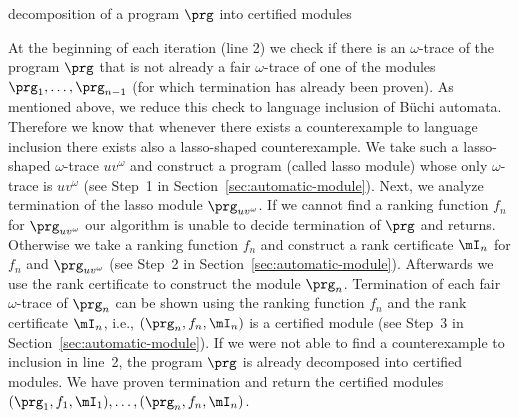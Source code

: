 \begin{algorithm}
\caption{decomposition of a program $\prg$ into certified modules }
\label{algo:decomp}
\end{algorithm}


At the beginning of each iteration (line 2) we check if there is an $\omega$-trace of the program $\prg$ that is not already a fair $\omega$-trace of one of the modules $\prg_1,\dots,\prg_{n-1}$ (for which termination has already been proven). As mentioned above, we reduce this check to language inclusion of Büchi automata. Therefore we know that whenever there exists a counterexample to language inclusion there exists also a lasso-shaped counterexample. We take such a lasso-shaped $\omega$-trace $uv^\omega$ and construct a program (called lasso module) whose only $\omega$-trace is $uv^\omega$ (see Step~1 in Section~\ref{sec:automatic-module}). Next, we analyze termination of the lasso module $\prg_{uv^\omega}$. If we cannot find a ranking function $f_{n}$ for $\prg_{uv^\omega}$ our algorithm is unable to decide termination of $\prg$ and returns.
Otherwise we take a ranking function $f_{n}$ and construct a rank certificate $\mI_{n}$ for $f_{n}$ and $\prg_{uv^\omega}$ (see Step~2 in Section~\ref{sec:automatic-module}).
Afterwards we use the rank certificate to construct the module $\prg_{n}$. Termination of each fair $\omega$-trace of $\prg_{n}$ can be shown using the ranking function $f_{n}$ and the rank certificate $\mI_{n}$, i.e., $(\prg_{n},f_{n},\mI_{n})$ is a certified module (see Step~3 in Section~\ref{sec:automatic-module}).
If we were not able to find a counterexample to inclusion in line~2, the program $\prg$ is already decomposed into certified modules. We have proven termination and return the certified modules $(\prg_1,f_1,\mI_1),\dots,(\prg_n,f_n,\mI_n)$.

